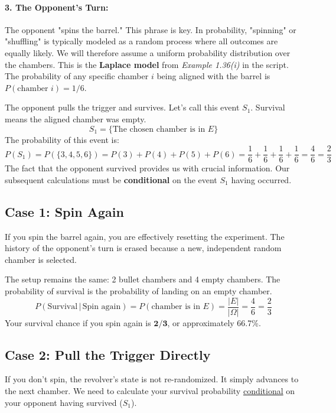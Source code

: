 \documentclass[11pt,a4paper]{article}
\theoremstyle{tutorstyle}
\newcommand{\concept}[2]{\hyperref[#1]{#2}}
\begin{document}
\paragraph{3. The Opponent's Turn:}
The opponent "spins the barrel." This phrase is key. In probability, "spinning" or "shuffling" is typically modeled as a random process where all outcomes are equally likely. We will therefore assume a uniform probability distribution over the chambers. This is the \textbf{Laplace model} from \textit{Example 1.36(i)} in the script. The probability of any specific chamber $i$ being aligned with the barrel is $P(\text{chamber } i) = 1/6$.

The opponent pulls the trigger and survives. Let's call this event $S_1$. Survival means the aligned chamber was empty.
\[
S_1 = \{\text{The chosen chamber is in } E\}
\]
The probability of this event is:
\[
P(S_1) = P(\{3, 4, 5, 6\}) = P(3) + P(4) + P(5) + P(6) = \frac{1}{6} + \frac{1}{6} + \frac{1}{6} + \frac{1}{6} = \frac{4}{6} = \frac{2}{3}
\]
The fact that the opponent survived provides us with crucial information. Our subsequent calculations must be \textbf{conditional} on the event $S_1$ having occurred.

\subsection{Case 1: Spin Again}
If you spin the barrel again, you are effectively resetting the experiment. The history of the opponent's turn is erased because a new, independent random chamber is selected.

The setup remains the same: 2 bullet chambers and 4 empty chambers. The probability of survival is the probability of landing on an empty chamber.
\[
P(\text{Survival} \,|\, \text{Spin again}) = P(\text{chamber is in } E) = \frac{|E|}{|\Omega|} = \frac{4}{6} = \frac{2}{3}
\]
Your survival chance if you spin again is $\mathbf{2/3}$, or approximately 66.7\%.

\subsection{Case 2: Pull the Trigger Directly}
If you don't spin, the revolver's state is not re-randomized. It simply advances to the next chamber. We need to calculate your survival probability \concept{concept_condprob}{conditional} on your opponent having survived ($S_1$).
\end{document}
